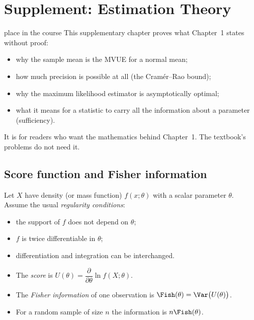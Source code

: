 \chapter{Supplement: Estimation Theory}

\begin{nuance}{place in the course}
This supplementary chapter proves what Chapter~1 states without proof:
\begin{itemize}
  \item why the sample mean is the MVUE for a normal mean;
  \item how much precision is possible at all (the Cram\'er--Rao bound);
  \item why the maximum likelihood estimator is asymptotically optimal;
  \item what it means for a statistic to carry all the information about a parameter (sufficiency).
\end{itemize}
It is for readers who want the mathematics behind Chapter~1. The textbook's problems do not need it.
\end{nuance}

\section{Score function and Fisher information}

Let $X$ have density (or mass function) $f(x;\theta)$ with a scalar parameter $\theta$. Assume the usual \emph{regularity conditions}:
\begin{itemize}
  \item the support of $f$ does not depend on $\theta$;
  \item $f$ is twice differentiable in $\theta$;
  \item differentiation and integration can be interchanged.
\end{itemize}

\begin{definition}
\begin{itemize}
  \item The \emph{score} is $U(\theta)=\dfrac{\partial}{\partial\theta}\ln f(X;\theta)$.
  \item The \emph{Fisher information} of one observation is $\Fish(\theta)=\Var\big(U(\theta)\big)$.
  \item For a random sample of size $n$ the information is $n\Fish(\theta)$.
\end{itemize}
\end{definition}

